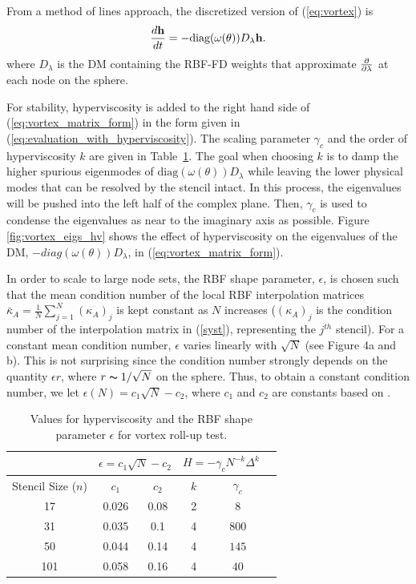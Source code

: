\documentclass{report}
\begin{document}
From a method of lines approach, the discretized version of (\ref{eq:vortex}) is
\begin{equation}
\frac{d \mathbf{h}}{d t} = - \text{diag}(\omega(\theta)) D_\lambda \mathbf{h}.
\label{eq:vortex_matrix_form}
\end{equation}
where $D_\lambda$ is the DM containing the RBF-FD weights that approximate $\frac{\partial }{\partial \lambda}$ at each node on the sphere.

For stability, hyperviscosity is added to the right hand side of (\ref{eq:vortex_matrix_form}) in the form given in (\ref{eq:evaluation_with_hyperviscosity}). The scaling parameter $\gamma_c$ and the order of hyperviscosity $k$ are given in
Table~\ref{tbl:vortex_hv_params}. The goal when choosing $k$ is to damp the higher spurious eigenmodes of $\text{diag}(\omega(\theta)) D_\lambda$ while leaving the lower physical modes that can be resolved by the stencil intact. In this process, the eigenvalues will be pushed into the left half of the complex plane. Then, $\gamma_c$ is used to condense the eigenvalues as near to the imaginary axis as possible. Figure \ref{fig:vortex_eigs_hv} shows the effect of hyperviscosity on the eigenvalues of the DM, $-diag(\omega(\theta)) D_\lambda$, in (\ref{eq:vortex_matrix_form}). 

In order to scale to large node sets, the RBF shape parameter, $\epsilon$, is chosen such that the mean condition number of the local RBF interpolation matrices $\bar{\kappa}_A = \frac{1}{N}\sum_{j=1}^N (\kappa_A)_j$ is kept constant as $N$ increases ($(\kappa_A)_j$ is the condition number of the interpolation matrix in (\ref{syst}), representing the $j^{th}$ stencil). For a constant mean condition number, $\epsilon$ varies linearly with $\sqrt{N}$ (see \cite{FlyerLehto11} Figure 4a and b). This is not surprising since the condition number strongly depends on the quantity $\epsilon r$, where $r\thicksim1/\sqrt{N}$ on the sphere. Thus, to obtain a constant condition number, we let $\epsilon (N) = c_1 \sqrt{N} - c_2$, where $c_1$ and $c_2$ are constants based on \cite{FlyerLehto11}.

\begin{table}[t]
\caption{Values for hyperviscosity and the RBF shape parameter $\epsilon$ for vortex roll-up test.}
\begin{center}
\begin{tabular}{|c|c|c|c|c|c|}
\hline		     & \multicolumn{2}{c|}{$\epsilon = c_1 \sqrt{N} - c_2$} & \multicolumn{2}{c|}{$H = -\gamma_{c} N^{-k} \Delta^{k}$ } \\ \hline
Stencil Size ($n$) & $c_{1}$ & $c_{2}$ & $k$ & $\gamma_c$ \\ \hline
17 & 0.026 & 0.08 & 2 & $8$ \\
31 & 0.035 & 0.1  & 4 & $800$ \\
50 & 0.044 & 0.14 & 4 & $145$ \\
101 & 0.058 & 0.16 & 4 & $40$ \\ \hline
\end{tabular}
\end{center}
\label{tbl:vortex_hv_params}
\end{table}
\end{document}
